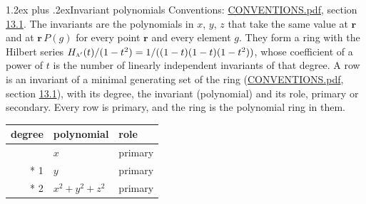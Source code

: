 \documentclass[10pt,a4paper]{article}
\makeatletter
\renewcommand\section{\@startsection{section}{1}{\z@}{-3ex plus -1ex minus -.2ex}%
  {1.2ex plus .2ex}{\normalfont\large\sffamily\bfseries\color{parttitle}}}
\numberwithin{equation}{section}
\newcommand{\irr}[1]{\text{\normalfont\scshape #1}}
\newcommand{\pointr}{\mathbf{r}}
\makeatother
\begin{document}
\section{Invariant polynomials}\label{s:invariant_polynomials}
Conventions: \href{../../CONVENTIONS.pdf}{CONVENTIONS.pdf}, section \href{../../CONVENTIONS.pdf\#conv.13.1}{13.1}.
The invariants are the polynomials in $x$, $y$, $z$ that take the same value at $\pointr$ and at $\pointr\,P(g)$ for every point $\pointr$ and every element $g$. They form a ring with the Hilbert series $H_{\irr{a}'}(t)/(1-t^{2}) = 1/((1-t)(1-t)(1-t^{2}))$, whose coefficient of a power of $t$ is the number of linearly independent invariants of that degree. \label{n:head.degree}\label{n:head.role}A row is an invariant of a minimal generating set of the ring (\href{../../CONVENTIONS.pdf}{CONVENTIONS.pdf}, section \href{../../CONVENTIONS.pdf\#conv.13.1}{13.1}), with its degree, the invariant (polynomial) and its role, primary or secondary. Every row is primary, and the ring is the polynomial ring in them.
{\small\begin{longtable}{@{}rll@{}}\toprule
degree & polynomial & role\\\midrule\endhead
\bottomrule\endfoot\endlastfoot
1 & $x$ & primary\\*
1 & $y$ & primary\\*
2 & $x^{2} + y^{2} + z^{2}$ & primary\\
\bottomrule\end{longtable}}
\end{document}
